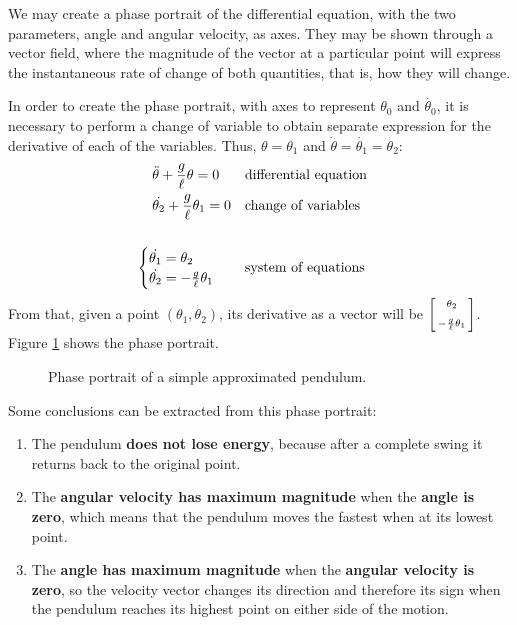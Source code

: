 \documentclass[12pt, a4paper, titlepage]{article}
\theoremstyle{definition}
\numberwithin{equation}{section}
\theoremstyle{definition}
\theoremstyle{definition}
\begin{document}
We may create a phase portrait of the differential equation, with the two parameters, angle and angular velocity, as axes. They may be shown through a vector field, where the magnitude of the vector at a particular point will express the instantaneous rate of change of both quantities, that is, how they will change.

In order to create the phase portrait, with axes to represent $\theta_0$ and $\dot{\theta_0}$, it is necessary to perform a change of variable to obtain separate expression for the derivative of each of the variables. Thus, $\theta=\theta_1$ and $\dot{\theta}=\dot{\theta_1}=\theta_2$:
\begin{align}
&\ddot{\theta}+\frac{g}{\ell}\theta=0&&\text{differential equation}\\
&\dot{\theta_2}+\frac{g}{\ell}\theta_1=0&&\text{change of variables}\\[16pt]
&\hspace{-12pt}\begin{cases}
\dot{\theta_1}=\theta_2\\
\dot{\theta_2}=-\frac{g}{\ell}\theta_1
\end{cases}&&\text{system of equations}\label{eq:syseq1}
\end{align}
From that, given a point $(\theta_1, \theta_2)$, its derivative as a vector will be $\begin{bsmallmatrix}\theta_2\\[6pt]-\frac{g}{\ell}\theta_1\end{bsmallmatrix}$. Figure \ref{fig:phase_approx_simple} shows the phase portrait.
\begin{figure}[H]
    \centering
    
    \caption[Phase portrait of an undamped approximated pendulum.]{Phase portrait of a simple approximated pendulum.}
    \label{fig:phase_approx_simple}
\end{figure}
Some conclusions can be extracted from this phase portrait:
\begin{enumerate}
\item The pendulum \textbf{does not lose energy}, because after a complete swing it returns back to the original point.
\item The \textbf{angular velocity has maximum magnitude} when the \textbf{angle is zero}, which means that the pendulum moves the fastest when at its lowest point.
\item The \textbf{angle has maximum magnitude} when the \textbf{angular velocity is zero}, so the velocity vector changes its direction and therefore its sign when the pendulum reaches its highest point on either side of the motion.
\end{enumerate}
\end{document}
